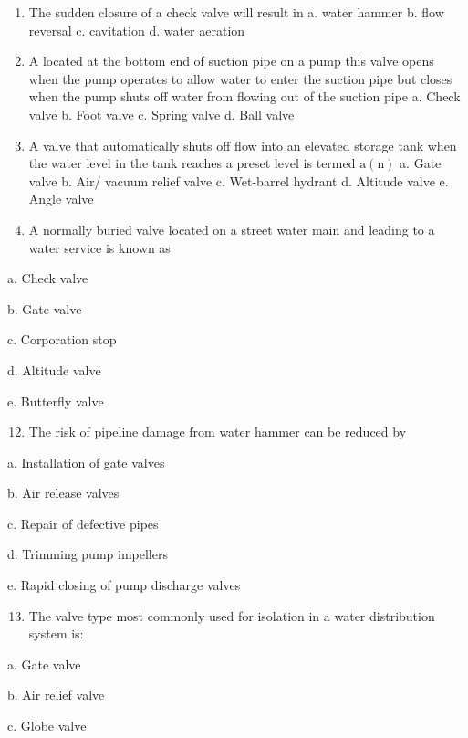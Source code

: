 \documentclass[10pt]{article}
\begin{document}
\begin{enumerate}
\begin{enumerate}
\begin{enumerate}
  \item The sudden closure of a check valve will result in
a. water hammer
b. flow reversal
c. cavitation
d. water aeration

  \item A located at the bottom end of suction pipe on a pump this valve opens when the pump operates to allow water to enter the suction pipe but closes when the pump shuts off water from flowing out of the suction pipe
a. Check valve
b. Foot valve
c. Spring valve
d. Ball valve

  \item A valve that automatically shuts off flow into an elevated storage tank when the water level in the tank reaches a preset level is termed $\mathrm{a}(\mathrm{n})$
a. Gate valve
b. Air/ vacuum relief valve
c. Wet-barrel hydrant
d. Altitude valve
e. Angle valve 

\item A normally buried valve located on a street water main and leading to a water service is known as

\end{enumerate}

a. Check valve

b. Gate valve

c. Corporation stop

d. Altitude valve

e. Butterfly valve

\begin{enumerate}
  \setcounter{enumi}{11}
  \item The risk of pipeline damage from water hammer can be reduced by
\end{enumerate}

a. Installation of gate valves

b. Air release valves

c. Repair of defective pipes

d. Trimming pump impellers

e. Rapid closing of pump discharge valves

\begin{enumerate}
  \setcounter{enumi}{12}
  \item The valve type most commonly used for isolation in a water distribution system is:
\end{enumerate}

a. Gate valve

b. Air relief valve

c. Globe valve


\end{enumerate}
\end{enumerate}
\end{document}
